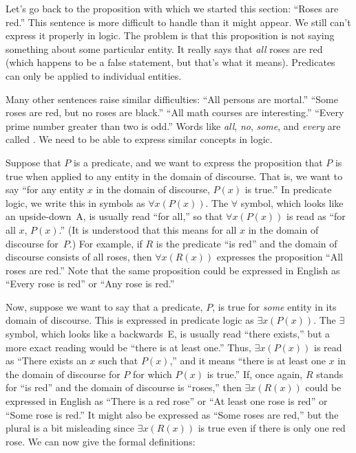 \medbreak
Let's go back to the proposition with which we started this section:
``Roses are red.''  This sentence is more difficult to handle than
it might appear.  We still can't express it properly in logic.
The problem is that this proposition is not saying something about
some particular entity.  It really says that \emph{all} roses are red 
(which happens to be a false statement, but that's what it means).
Predicates can only be applied to individual entities.

Many other sentences raise similar difficulties:
``All persons are mortal.''  ``Some roses are red, but no roses are black.''
``All math courses are interesting.''  ``Every prime number greater than two
is odd.''  Words like \emph{all}, \emph{no}, \emph{some}, and \emph{every}
are called .  We need to be able to express similar concepts
in logic.

Suppose that $P$ is a predicate, and we want to express the proposition that
$P$ is true when applied to any entity in the domain of discourse.
That is, we want to say ``for any entity $x$ in the domain of discourse,
$P(x)$ is true.''  In predicate logic, we write this in symbols as
$\forall x(P(x))$.  The $\forall$ symbol, which looks like an
upside-down~A, is usually read ``for all,'' so that $\forall x(P(x))$
is read as ``for all $x$, $P(x)$.''  (It is understood that this means
for all $x$ in the domain of discourse for~$P$.)  For example,
if $R$ is the predicate ``is red'' and the domain of discourse consists
of all roses, then $\forall x(R(x))$ expresses the proposition
``All roses are red.''  Note that the same proposition could be
expressed in English as ``Every rose is red'' or ``Any rose is red.''
 
Now, suppose we want to say that a predicate, $P$, is true for \emph{some}
entity in its domain of discourse.  This is expressed in predicate
logic as $\exists x(P(x))$.  The $\exists$ symbol, which looks like a
backwards~E, is usually read ``there exists,'' but a more exact reading
would be ``there is at least one.'' Thus, $\exists x(P(x))$ is read
as ``There exists an $x$ such that $P(x)$,'' and it means ``there is
at least one $x$ in the domain of discourse for $P$ for which $P(x)$
is true.''  If, once again, $R$ stands for ``is red'' and the domain
of discourse is ``roses,'' then $\exists x(R(x))$ could be expressed
in English as ``There is a red rose'' or ``At least one rose is red''
or ``Some rose is red.''  It might also be expressed as ``Some roses
are red,'' but the plural is a bit misleading since $\exists x(R(x))$
is true even if there is only one red rose.
We can now give the formal definitions:

